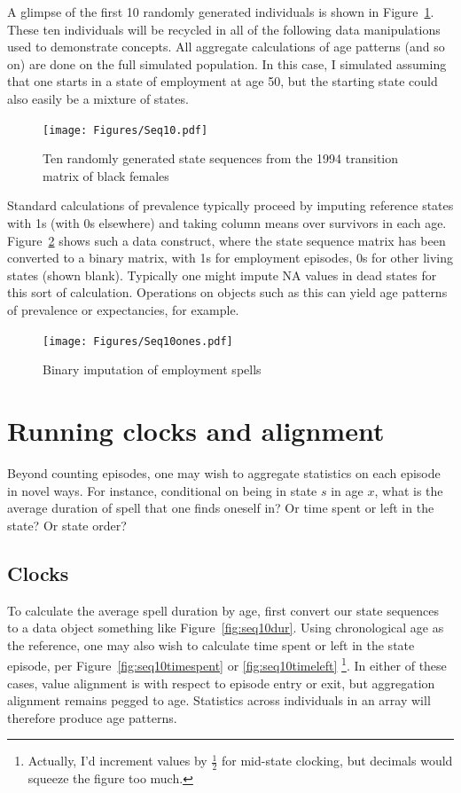 \documentclass{article}
\begin{document}
A glimpse of the first 10 randomly generated individuals is shown in
Figure~\ref{fig:seq10}. These ten individuals will be recycled in all of the
following data manipulations used to demonstrate concepts. All aggregate
calculations of age patterns (and so on) are done on the full simulated population. In this case, I simulated
assuming that one starts in a state of employment at age 50, but the starting
state could also easily be a mixture of states.

\begin{figure}[ht!]
\centering
\caption{Ten randomly generated state sequences from the 1994 transition matrix
of black females \citep{Dudel2017}}
\label{fig:seq10}
\texttt{[image: Figures/Seq10.pdf]}
\end{figure}

Standard calculations of prevalence typically proceed by imputing reference
states with 1s (with 0s elsewhere) and taking column means over survivors in
each age. Figure~\ref{fig:seq10ones} shows such a data construct, where the
state sequence matrix has been converted to a binary matrix, with 1s for
employment episodes, 0s for other living states (shown blank). Typically one
might impute NA values in dead states for this sort of calculation. Operations on
objects such as this can yield age patterns of prevalence or
expectancies, for example.

 \begin{figure}[ht!]
\centering
\caption{Binary imputation of employment spells}
\label{fig:seq10ones}
\texttt{[image: Figures/Seq10ones.pdf]}
\end{figure}


\FloatBarrier
\section{Running clocks and alignment}
Beyond counting episodes, one may wish to aggregate statistics on each episode
in novel ways. For instance, conditional on being in state $s$ in age $x$, what
is the average duration of spell that one finds oneself in? Or time spent or
left in the state? Or state order?

\subsection{Clocks}
\label{sec:clocks}
To calculate the average spell duration by age, first convert our state
sequences to a data object something like Figure~\ref{fig:seq10dur}. Using chronological age as the reference, one may also wish to calculate time
spent or left in the state episode, per
Figure~\ref{fig:seq10timespent} or \ref{fig:seq10timeleft} \footnote{Actually,
I'd increment values by $\frac{1}{2}$ for mid-state clocking, but decimals would squeeze the figure too
much.}. In either of these cases, value alignment is with respect to episode
entry or exit, but aggregation alignment remains pegged to age. Statistics
across individuals in an array will therefore produce age patterns.
\end{document}
